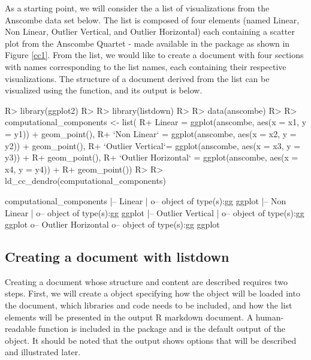 \documentclass[
]{jss}
\begin{document}
As a starting point, we will consider the a list of visualizations from
the Anscombe data set below. The list is composed of four 
\citep{wickham2016} elements (named Linear, Non Linear, Outlier
Vertical, and Outlier Horizontal) each containing a scatter plot from
the Anscombe Quartet - made available in the  package
\citep{R} as shown in Figure \ref{cc1}. From the
 list, we would like to create a document
with four sections with names corresponding to the list names, each
containing their respective visualizations. The structure of a document
derived from the  list can be visualized
using the  function, and its output is below.

\begin{CodeChunk}

\begin{CodeInput}
R> library(ggplot2)
R> 
R> library(listdown)
R> 
R> data(anscombe)
R> 
R> computational_components <- list(
R+   Linear = ggplot(anscombe, aes(x = x1, y = y1)) + geom_point(),
R+   `Non Linear` = ggplot(anscombe, aes(x = x2, y = y2)) + geom_point(),
R+   `Outlier Vertical`= ggplot(anscombe, aes(x = x3, y = y3)) + 
R+     geom_point(),
R+   `Outlier Horizontal` =  ggplot(anscombe, aes(x = x4, y = y4)) + 
R+     geom_point())
R> 
R> ld_cc_dendro(computational_components)
\end{CodeInput}

\begin{CodeOutput}

computational_components
  |-- Linear
  |  o-- object of type(s):gg ggplot
  |-- Non Linear
  |  o-- object of type(s):gg ggplot
  |-- Outlier Vertical
  |  o-- object of type(s):gg ggplot
  o-- Outlier Horizontal
     o-- object of type(s):gg ggplot
\end{CodeOutput}
\end{CodeChunk}

\hypertarget{creating-a-document-with-listdown}{%
\subsection{Creating a document with
listdown}\label{creating-a-document-with-listdown}}

Creating a document whose structure and content are described
 requires two steps. First, we will
create a  object specifying how the \newline
{} object will be loaded into the document,
which libraries and code needs to be included, and how the list elements
will be presented in the output R markdown document. A human-readable
 function is included in the package and is the default
output of the object. It should be noted that the output shows options
that will be described and illustrated later.
\end{document}
